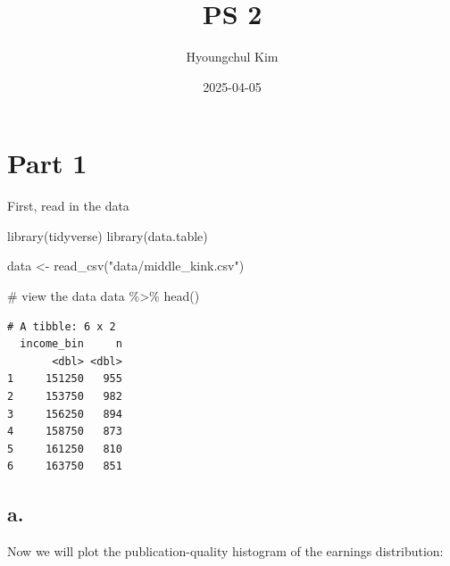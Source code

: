 \documentclass[
  letterpaper,
  DIV=11,
  numbers=noendperiod]{scrartcl}
\title{PS 2}
\author{Hyoungchul Kim}
\date{2025-04-05}
\newenvironment{Shaded}{\begin{snugshade}}{\end{snugshade}}
\newcommand{\CommentTok}[1]{\textcolor[rgb]{0.37,0.37,0.37}{#1}}
\newcommand{\FunctionTok}[1]{\textcolor[rgb]{0.28,0.35,0.67}{#1}}
\newcommand{\NormalTok}[1]{\textcolor[rgb]{0.00,0.23,0.31}{#1}}
\newcommand{\OtherTok}[1]{\textcolor[rgb]{0.00,0.23,0.31}{#1}}
\newcommand{\SpecialCharTok}[1]{\textcolor[rgb]{0.37,0.37,0.37}{#1}}
\newcommand{\StringTok}[1]{\textcolor[rgb]{0.13,0.47,0.30}{#1}}
\begin{document}
\maketitle


\section{Part 1}\label{part-1}

First, read in the data

\begin{Shaded}
\begin{Highlighting}[]
\FunctionTok{library}\NormalTok{(tidyverse)}
\FunctionTok{library}\NormalTok{(data.table)}

\NormalTok{data }\OtherTok{\textless{}{-}} \FunctionTok{read\_csv}\NormalTok{(}\StringTok{"data/middle\_kink.csv"}\NormalTok{)}

\CommentTok{\# view the data}
\NormalTok{data }\SpecialCharTok{\%\textgreater{}\%} \FunctionTok{head}\NormalTok{()}
\end{Highlighting}
\end{Shaded}

\begin{verbatim}
# A tibble: 6 x 2
  income_bin     n
       <dbl> <dbl>
1     151250   955
2     153750   982
3     156250   894
4     158750   873
5     161250   810
6     163750   851
\end{verbatim}

\subsection{a.}\label{a.}

Now we will plot the publication-quality histogram of the earnings
distribution:
\end{document}
